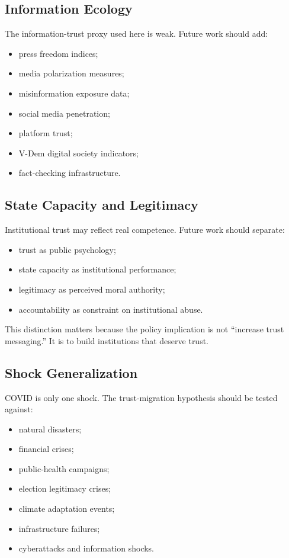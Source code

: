 \documentclass[12pt]{article}
\begin{document}
\subsection{Information Ecology}

The information-trust proxy used here is weak. Future work should add:

\begin{itemize}
  \item press freedom indices;
  \item media polarization measures;
  \item misinformation exposure data;
  \item social media penetration;
  \item platform trust;
  \item V-Dem digital society indicators;
  \item fact-checking infrastructure.
\end{itemize}

\subsection{State Capacity and Legitimacy}

Institutional trust may reflect real competence. Future work should separate:

\begin{itemize}
  \item trust as public psychology;
  \item state capacity as institutional performance;
  \item legitimacy as perceived moral authority;
  \item accountability as constraint on institutional abuse.
\end{itemize}

This distinction matters because the policy implication is not ``increase trust messaging.'' It is to build institutions that deserve trust.

\subsection{Shock Generalization}

COVID is only one shock. The trust-migration hypothesis should be tested against:

\begin{itemize}
  \item natural disasters;
  \item financial crises;
  \item public-health campaigns;
  \item election legitimacy crises;
  \item climate adaptation events;
  \item infrastructure failures;
  \item cyberattacks and information shocks.
\end{itemize}
\end{document}
